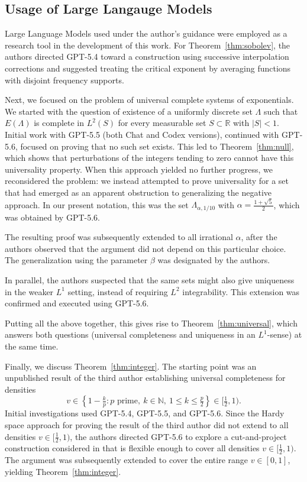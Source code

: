 \documentclass[reqno,a4paper,12pt]{amsart}
\numberwithin{equation}{section}
\def\R{{\mathbb R}}
\newcommand\1{\mathds{1}}
\begin{document}
\subsection*{Usage of Large Langauge Models}\label{sec:llmusageandlean}

Large Language Models used under the author's guidance were employed as a research tool in the development of this work. For Theorem~\ref{thm:sobolev}, the authors directed GPT-5.4 toward a construction using successive
interpolation corrections and suggested treating the critical exponent by averaging functions with disjoint frequency supports.

Next, we focused on the problem of universal complete systems of exponentials. We started with the question of existence of a uniformly discrete set $\Lambda$ such that $E(\Lambda)$ is complete in $L^2(S)$ for every measurable set $S\subset\R$ with $|S|<1$. Initial work with GPT-5.5 (both Chat and Codex versions), continued with GPT-5.6, focused on proving that no such set exists. This led to Theorem~\ref{thm:null}, which shows that perturbations of the integers tending to zero cannot have this universality property. When this approach yielded no further progress, we reconsidered the problem: we instead attempted to prove universality for a set that had emerged as an apparent obstruction to generalizing the negative approach. In our present notation, this was the set $\Lambda_{\alpha,1/10}$ with $\alpha=\frac{1+\sqrt{5}}{2}$, which was obtained by GPT-5.6.


The resulting proof was subsequently extended to all irrational $\alpha$, after the authors observed that the argument did not depend on this particular choice. The generalization using the parameter $\beta$ was designated by the authors.

In parallel, the authors suspected that the same sets might also give uniqueness in the weaker $L^1$ setting, instead of requiring $L^2$ integrability. This extension was confirmed and executed using GPT-5.6.

Putting all the above together, this gives rise to Theorem~\ref{thm:universal}, which answers both questions (universal completeness and uniqueness in an $L^1$-sense) at the same time.

Finally, we discuss Theorem~\ref{thm:integer}. The starting point was an unpublished result of the third author establishing universal completeness
for densities $$v\in\left\{1-\tfrac{k}{p}:
p\text{ prime},\ k\in\mathbb N,\ 1\leq k\leq\tfrac{p}{2}\right\} \in [\tfrac12,1).$$ Initial investigations used GPT-5.4, GPT-5.5, and GPT-5.6. Since the Hardy space approach for proving the result of the third author did not extend to all densities $v \in [\frac12,1)$, the authors directed GPT-5.6 to explore a cut-and-project construction considered in \cite{MateiMeyer2009,KozmaLev2011} that is flexible enough to cover all densities $v \in [\frac12,1)$. The argument was subsequently extended to cover the entire range $v\in[0,1]$, yielding Theorem~\ref{thm:integer}.
\end{document}

